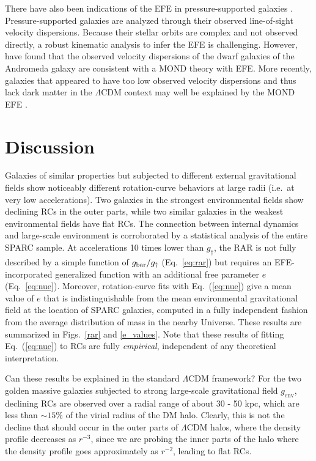 \documentclass[twocolumn,tighten]{aastex63}
\begin{document}
There have also been indications of the EFE in pressure-supported galaxies \citep{MM13a,MM13b,FMM18,Krou18}. Pressure-supported galaxies are analyzed through their observed line-of-sight velocity dispersions. Because their stellar orbits are complex and not observed directly, a robust kinematic analysis to infer the EFE is challenging. However, \cite{MM13a, MM13b} have found that the observed velocity dispersions of the dwarf galaxies of the Andromeda galaxy are consistent with a MOND theory with EFE.  More recently, galaxies that appeared to have too low observed velocity dispersions and thus lack dark matter in the $\Lambda$CDM context \citep{vD18,vD19} may well be explained by the MOND EFE \citep{FMM18,Krou18,Mul19,Hag19}. 
  
\section{Discussion}  \label{sec:disc}

Galaxies of similar properties but subjected to different external gravitational fields show noticeably different rotation-curve behaviors at large radii (i.e.\ at very low accelerations).
Two galaxies in the strongest environmental fields show declining RCs in the outer parts, while two similar galaxies in the weakest environmental fields have flat RCs. 
The connection between internal dynamics and large-scale environment is corroborated by a statistical analysis of the entire SPARC sample. At accelerations 10 times lower than $g_\dagger$, the RAR is not fully described by a simple function of $g_{\rm bar}/g_\dagger$ (Eq.~\ref{eq:rar}) but requires an EFE-incorporated generalized function with an additional free parameter $e$ (Eq.~\ref{eq:nue}). Moreover, rotation-curve fits with Eq.~(\ref{eq:nue}) give a mean value of $e$ that is indistinguishable from the mean environmental gravitational field at the location of SPARC galaxies, computed in a fully independent fashion from the average distribution of mass in the nearby Universe. These results are summarized in Figs.~\ref{rar} and \ref{e_values}. Note that these results of fitting Eq.~(\ref{eq:nue}) to RCs are fully \emph{empirical}, independent of any theoretical interpretation. 

Can these results be explained in the standard $\Lambda$CDM framework? For the two golden massive galaxies subjected to strong large-scale gravitational field $g_\text{env}$, declining RCs are observed over a radial range of about 30 - 50 kpc, which are less than $\sim 15\%$ of the virial radius of the DM halo. 
Clearly, this is not the decline that should occur in the outer parts of $\Lambda$CDM halos, where the density profile decreases as $r^{-3}$, since we are probing the inner parts of the halo where the density profile goes approximately as $r^{-2}$, leading to flat RCs.
\end{document}
